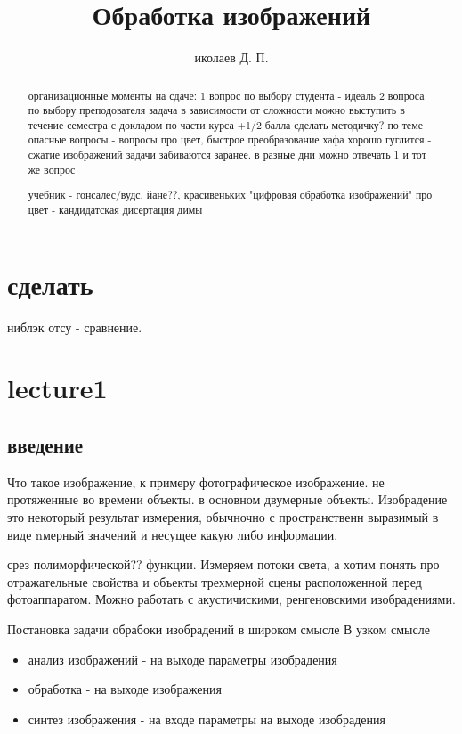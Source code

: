 \documentclass[]{report}
\title{Обработка изображений}
\author{иколаев Д. П.}
\begin{document}
\maketitle

\begin{abstract}
	организационные моменты
	на сдаче:
		1 вопрос по выбору студента - идеаль
		2 вопроса по выбору преподователя
		задача в зависимости от сложности
	можно выступить в течение семестра с докладом по части курса +1/2 балла
	сделать методичку? по теме
	опасные вопросы - вопросы про цвет, быстрое преобразование хафа
	хорошо гуглится - сжатие изображений
	задачи забиваются заранее.
	в разные дни можно отвечать 1 и тот же вопрос
	
	учебник - гонсалес/вудс, йане??, красивеньких "цифровая обработка изображений"
	про цвет - кандидатская дисертация димы
\end{abstract}

\chapter{сделать}
ниблэк отсу - сравнение.
\chapter{lecture1}

\section{введение}
Что такое изображение, к примеру фотографическое изображение.
не протяженные во времени объекты. в основном двумерные объекты.
Изобрадение это некоторый результат измерения, обычночно с пространственн выразимый в виде nмерный значений и несущее какую либо информации. 

срез полиморфической?? функции. Измеряем потоки света, а хотим понять про отражательные свойства и объекты трехмерной сцены расположенной перед фотоаппаратом. Можно работать с акустичискими, ренгеновскими изобрадениями.

Постановка задачи обрабоки изобрадений в широком смысле
В узком смысле 
\begin{itemize}
	\item анализ изображений - на выходе параметры изобрадения
	\item обработка - на выходе изображения
	\item синтез изображения - на входе параметры на выходе изобрадения
\end{itemize}
\end{document}
